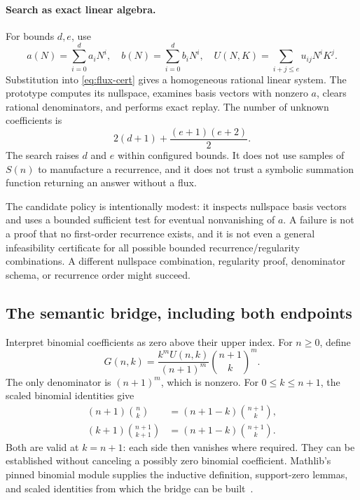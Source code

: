 \paragraph{Search as exact linear algebra.}
For bounds $d,e$, use
\[
 a(N)=\sum_{i=0}^d a_iN^i,\quad
 b(N)=\sum_{i=0}^d b_iN^i,\quad
 U(N,K)=\sum_{i+j\le e}u_{ij}N^iK^j.
\]
Substitution into \eqref{eq:flux-cert} gives a homogeneous rational linear system. The prototype computes its nullspace, examines basis vectors with nonzero $a$, clears rational denominators, and performs exact replay. The number of unknown coefficients is
\[
 2(d+1)+\frac{(e+1)(e+2)}2.
\]
The search raises $d$ and $e$ within configured bounds. It does not use samples of $S(n)$ to manufacture a recurrence, and it does not trust a symbolic summation function returning an answer without a flux.

The candidate policy is intentionally modest: it inspects nullspace basis vectors and uses a bounded sufficient test for eventual nonvanishing of $a$. A failure is not a proof that no first-order recurrence exists, and it is not even a general infeasibility certificate for all possible bounded recurrence/regularity combinations. A different nullspace combination, regularity proof, denominator schema, or recurrence order might succeed.

\subsection{The semantic bridge, including both endpoints}

Interpret binomial coefficients as zero above their upper index. For $n\ge0$, define
\begin{equation}
 G(n,k)=\frac{k^m U(n,k)}{(n+1)^m}\binom{n+1}{k}^m.
 \label{eq:flux}
\end{equation}
The only denominator is $(n+1)^m$, which is nonzero. For $0\le k\le n+1$, the scaled binomial identities give
\begin{align}
 (n+1)\binom nk&=(n+1-k)\binom{n+1}k,\label{eq:choose-n}\\
 (k+1)\binom{n+1}{k+1}&=(n+1-k)\binom{n+1}k.
 \label{eq:choose-k}
\end{align}
Both are valid at $k=n+1$: each side then vanishes where required. They can be established without canceling a possibly zero binomial coefficient. Mathlib's pinned binomial module supplies the inductive definition, support-zero lemmas, and scaled identities from which the bridge can be built~\cite{mathlib-choose}.

